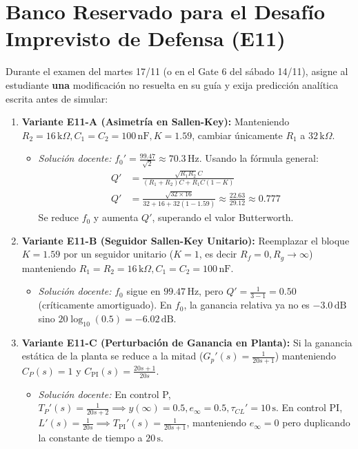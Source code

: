 \documentclass[11pt, a4paper]{article}
\begin{document}
\section{Banco Reservado para el Desafío Imprevisto de Defensa (E11)}
Durante el examen del martes 17/11 (o en el Gate 6 del sábado 14/11), asigne al estudiante \textbf{una} modificación no resuelta en su guía y exija predicción analítica escrita antes de simular:
\begin{enumerate}[noitemsep]
    \item \textbf{Variante E11-A (Asimetría en Sallen-Key):} Manteniendo $R_2 = 16\,\text{k}\Omega, C_1 = C_2 = 100\,\text{nF}, K = 1.59$, cambiar únicamente $R_1$ a $32\,\text{k}\Omega$.
    \begin{itemize}[noitemsep]
        \item \textit{Solución docente:} $f_0' = \frac{99.47}{\sqrt{2}} \approx 70.3\,\text{Hz}$. Usando la fórmula general:
        \begin{align*}
            Q' &= \frac{\sqrt{R_1 R_2} C}{(R_1 + R_2)C + R_1 C(1 - K)} \\
            Q' &= \frac{\sqrt{32 \times 16}}{32 + 16 + 32(1 - 1.59)} \approx \frac{22.63}{29.12} \approx 0.777
        \end{align*}
        Se reduce $f_0$ y aumenta $Q'$, superando el valor Butterworth.
    \end{itemize}
    \item \textbf{Variante E11-B (Seguidor Sallen-Key Unitario):} Reemplazar el bloque $K=1.59$ por un seguidor unitario ($K = 1$, es decir $R_f = 0, R_g \to \infty$) manteniendo $R_1 = R_2 = 16\,\text{k}\Omega, C_1 = C_2 = 100\,\text{nF}$.
    \begin{itemize}[noitemsep]
        \item \textit{Solución docente:} $f_0$ sigue en $99.47\,\text{Hz}$, pero $Q' = \frac{1}{3 - 1} = 0.50$ (críticamente amortiguado). En $f_0$, la ganancia relativa ya no es $-3.0\,\text{dB}$ sino $20\log_{10}(0.5) = -6.02\,\text{dB}$.
    \end{itemize}
    \item \textbf{Variante E11-C (Perturbación de Ganancia en Planta):} Si la ganancia estática de la planta se reduce a la mitad ($G_p'(s) = \frac{1}{20s+1}$) manteniendo $C_P(s)=1$ y $C_{\text{PI}}(s) = \frac{20s+1}{20s}$.
    \begin{itemize}[noitemsep]
        \item \textit{Solución docente:} En control P, $T_P'(s) = \frac{1}{20s+2} \implies y(\infty) = 0.5, e_\infty = 0.5, \tau_{CL}' = 10\,\text{s}$. En control PI, $L'(s) = \frac{1}{20s} \implies T_{\text{PI}}'(s) = \frac{1}{20s+1}$, manteniendo $e_\infty = 0$ pero duplicando la constante de tiempo a $20\,\text{s}$.
    \end{itemize}
\end{enumerate}
\end{document}
